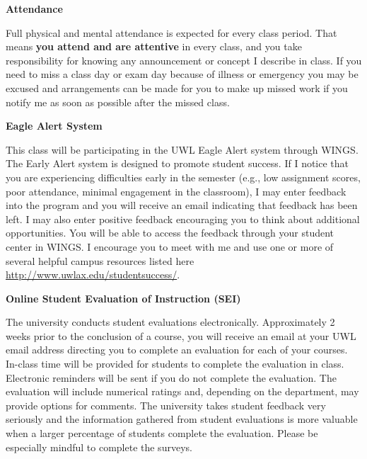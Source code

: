 \documentclass[10pt]{article}
\newcommand{\bulurl}[1]{\url{#1}}
\newcommand{\toprule}{\par\vspace*{5pt}\noindent{\hrule\hfill}\par\vspace*{1pt}}
\newcommand{\botrule}{\par\noindent{\hrule\hfill}\par}
\begin{document}
\botrule \textbf{Attendance} \toprule
Full physical and mental attendance is expected for every class period. That means \textbf{you attend and are attentive} in every class, and you take responsibility for knowing any announcement or concept I describe in class.  If you need to miss a class day or exam day because of illness or emergency you may be excused and arrangements can be made for you to make up missed work if you notify me as soon as possible after the missed class.  \\

\botrule \textbf{Eagle Alert System} \toprule 
This class will be participating in the UWL Eagle Alert system through WINGS. The Early Alert system is designed to promote student success. If I notice that you are experiencing difficulties early in the semester (e.g., low assignment scores, poor attendance, minimal engagement in the classroom), I may enter feedback into the program and you will receive an email indicating that feedback has been left.  I may also enter positive feedback encouraging you to think about additional opportunities. You will be able to access the feedback through your student center in WINGS.  I encourage you to meet with me and use one or more of several helpful campus resources listed here \bulurl{http://www.uwlax.edu/studentsuccess/}. \\

\botrule \textbf{Online Student Evaluation of Instruction (SEI)} \toprule
The university conducts student evaluations electronically. Approximately 2 weeks prior to the conclusion of a course, you will receive an email at your UWL email address directing you to complete an evaluation for each of your courses. In-class time will be provided for students to complete the evaluation in class. Electronic reminders will be sent if you do not complete the evaluation. The evaluation will include numerical ratings and, depending on the department, may provide options for comments. The university takes student feedback very seriously and the information gathered from student evaluations is more valuable when a larger percentage of students complete the evaluation. Please be especially mindful to complete the surveys.\\
\end{document}
